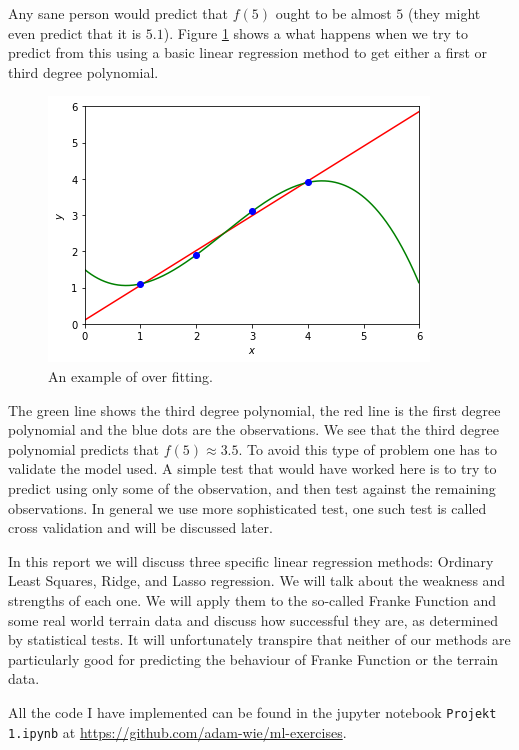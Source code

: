 \documentclass[parskip=half]{scrartcl}
\theoremstyle{definition}
\theoremstyle{remark}
\begin{document}
Any sane person would predict that $f(5)$ ought to be almost $5$ (they might even predict that it is $5.1$). 
Figure \ref{fig:overfitting} shows a what happens when we try to predict from this using a basic linear regression method to get either a first or third degree polynomial.

\begin{figure}[H]
\caption{An example of over fitting.}
\label{fig:overfitting}
\centering
\includegraphics[scale=0.5]{overfitting.png}
\end{figure}

The green line shows the third degree polynomial, the red line is the first degree polynomial and the blue dots are the observations. 
We see that the third degree polynomial predicts that $f(5) \approx 3.5$. 
To avoid this type of problem one has to validate the model used.
A simple test that would have worked here is to try to predict using only some of the observation, and then test against the remaining observations.
In general we use more sophisticated test, one such test is called cross validation and will be discussed later.

In this report we will discuss three specific linear regression methods: Ordinary Least Squares, Ridge, and Lasso regression.
We will talk about the weakness and strengths of each one. 
We will apply them to the so-called Franke Function and some real world terrain data and discuss how successful they are, as determined by statistical tests.
It will unfortunately transpire that neither of our methods are particularly good for predicting the behaviour of Franke Function or the terrain data.

\begin{framed}
All the code I have implemented can be found in the jupyter notebook \texttt{Projekt 1.ipynb} at \url{https://github.com/adam-wie/ml-exercises}.
\end{framed}
\end{document}
